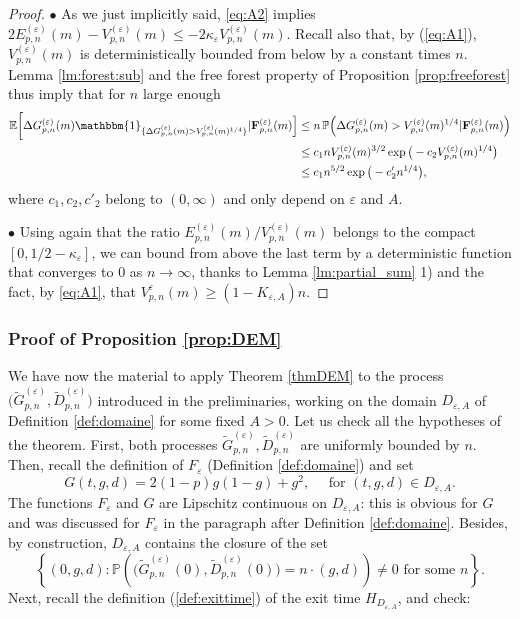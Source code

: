 \documentclass[a4, 11pt]{article}
\numberwithin{equation}{section}
\theoremstyle{plain}
\theoremstyle{definition}
\theoremstyle{remark}
\begin{document}
\begin{proof}
	\hspace{0.5cm} $\bullet$ As we just implicitly said, \eqref{eq:A2} implies
$2E_{p,n}^{(\varepsilon)}(m)-V_{p,n}^{(\varepsilon)}(m) \leq -2\kappa_{\varepsilon}V_{p,n}^{(\varepsilon)}(m)$. Recall also that, by (\ref{eq:A1}),$V_{p,n}^{(\varepsilon)}(m)$ is deterministically bounded from below by a constant times $n$. Lemma \ref{lm:forest:sub} and the free forest property of Proposition \ref{prop:freeforest} thus imply that for $n$ large enough
\begin{align}
\label{maj:esp_sauts}
	\mathbb{E}\bigg[\Delta G_{p,n}^{(\varepsilon)}(m)\mathbbm{1}_{\{\Delta G_{p,n}^{(\varepsilon)}(m)>V_{p,n}^{(\varepsilon)}(m)^{1/4}\}}\vert {\mathbf{F}}^{(\varepsilon)}_{p,n}(m)\Big]
	&\leq n\,\mathbb{P}\Big(\Delta G_{p,n}^{(\varepsilon)}(m)>V_{p,n}^{(\varepsilon)}(m)^{1/4} \vert {\mathbf{F}}^{(\varepsilon)}_{p,n}(m) \Big)\notag\\
	&\leq c_1 nV_{p,n}^{(\varepsilon)}(m)^{3/2}\exp\big(-c_2V_{p,n}^{(\varepsilon)}(m)^{1/4}\big) \notag\\
	&\leq c_1n^{5/2}\exp\big(-c'_2 n^{1/4}\big),
\end{align}	
where $c_1,c_2,c'_2$ belong to $(0,\infty)$ and only depend on $\varepsilon$ and $A$.

	\hspace{0.5cm}  $\bullet$ Using again that the ratio $E_{p,n}^{(\varepsilon)}(m)/V_{p,n}^{(\varepsilon)}(m)$ belongs to the compact $\left[0,1/2-\kappa_{\varepsilon}\right]$, we can bound from above the last term by a deterministic function that converges to 0 as $n\rightarrow \infty$, thanks to Lemma \ref{lm:partial_sum} 1) and the fact, by \eqref{eq:A1}, that $V_{p,n}^{\varepsilon}(m) \geq (1-K_{\varepsilon,A})n$.
\end{proof}

\subsubsection{Proof of Proposition \ref{prop:DEM}}
\label{proof:Prop46}

We have now the material to apply Theorem \ref{thmDEM} to the process $\big(\tilde{G}^{(\varepsilon)}_{p,n},\tilde{D}^{(\varepsilon)}_{p,n}\big)$ introduced in the preliminaries, working on the domain $D_{\varepsilon,A}$ of Definition \ref{def:domaine} for some fixed $A>0$. Let us check all the hypotheses of the theorem. First, both processes $\tilde{G}^{(\varepsilon)}_{p,n},\tilde{D}^{(\varepsilon)}_{p,n}$ are uniformly bounded by $n$. Then, recall the definition of $F_{\varepsilon}$  (Definition \ref{def:domaine}) and set 
$$
G(t,g,d)=2(1-p)g(1-g)+g^2, \quad \text{ for }(t,g,d) \in D_{\varepsilon,A}.
$$ 
The functions $F_{\varepsilon}$ and $G$ are Lipschitz continuous on $D_{\varepsilon,A}$: this is obvious for $G$ and was discussed for $F_{\varepsilon}$ in the paragraph after Definition \ref{def:domaine}. Besides, by construction, 
$D_{\varepsilon,A}$ contains the closure of the set 
$$\left\{\left(0,g,d\right):\mathbb{P}\left(\big(\tilde{G}^{(\varepsilon)}_{p,n}(0),\tilde{D}^{(\varepsilon)}_{p,n}(0)\big)=n\cdot(g,d)\right)\neq 0 \text{ for some }n \right\}.$$
Next, recall the definition (\ref{def:exittime}) of the exit time $H_{D_{\varepsilon,A}}$, and check:
\end{document}
